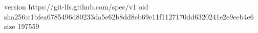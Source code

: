 version https://git-lfs.github.com/spec/v1
oid sha256:c1bfea6785496d80233da5e62b8dd8eb69e11f1127170dd6320241e2e9eeb4e6
size 197559
